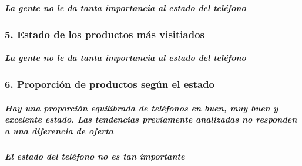 \documentclass[11pt]{article}
\begin{document}
    \begin{center}
    \end{center}

    \hypertarget{la-gente-no-le-da-tanta-importancia-al-estado-del-teluxe9fono}{%
\subparagraph{La gente no le da tanta importancia al estado del
teléfono}\label{la-gente-no-le-da-tanta-importancia-al-estado-del-teluxe9fono}}

    \hypertarget{estado-de-los-productos-muxe1s-visitiados}{%
\subsubsection{5. Estado de los productos más
visitiados}\label{estado-de-los-productos-muxe1s-visitiados}}

    
    \begin{center}
    \end{center}

    \hypertarget{la-gente-no-le-da-tanta-importancia-al-estado-del-teluxe9fono}{%
\subparagraph{La gente no le da tanta importancia al estado del
teléfono}\label{la-gente-no-le-da-tanta-importancia-al-estado-del-teluxe9fono}}

    \hypertarget{proporciuxf3n-de-productos-seguxfan-el-estado}{%
\subsubsection{6. Proporción de productos según el
estado}\label{proporciuxf3n-de-productos-seguxfan-el-estado}}

    
    \begin{center}
    \end{center}
    
    \hypertarget{hay-una-proporciuxf3n-equilibrada-de-teluxe9fonos-en-buen-muy-buen-y-excelente-estado.-las-tendencias-previamente-analizadas-no-responden-a-una-diferencia-de-oferta}{%
\subparagraph{Hay una proporción equilibrada de teléfonos en buen, muy
buen y excelente estado. Las tendencias previamente analizadas no
responden a una diferencia de
oferta}\label{hay-una-proporciuxf3n-equilibrada-de-teluxe9fonos-en-buen-muy-buen-y-excelente-estado.-las-tendencias-previamente-analizadas-no-responden-a-una-diferencia-de-oferta}}

    \hypertarget{el-estado-del-teluxe9fono-no-es-tan-importante}{%
\subparagraph{El estado del teléfono no es tan
importante}\label{el-estado-del-teluxe9fono-no-es-tan-importante}}
\end{document}
